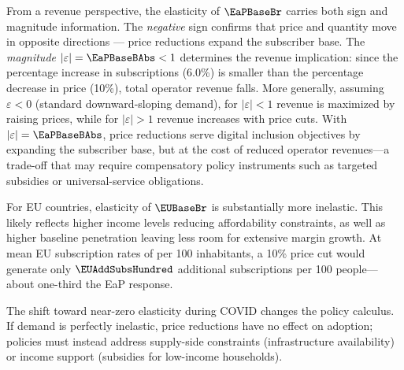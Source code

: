 From a revenue perspective, the elasticity of $\EaPBaseBr$ carries both sign and magnitude information. The \emph{negative} sign confirms that price and quantity move in opposite directions --- price reductions expand the subscriber base. The \emph{magnitude} $|\varepsilon| = \EaPBaseBAbs < 1$ determines the revenue implication: since the percentage increase in subscriptions (6.0\%) is smaller than the percentage decrease in price (10\%), total operator revenue falls. More generally, assuming $\varepsilon < 0$ (standard downward-sloping demand), for $|\varepsilon| < 1$ revenue is maximized by raising prices, while for $|\varepsilon| > 1$ revenue increases with price cuts. With $|\varepsilon| = \EaPBaseBAbs$, price reductions serve digital inclusion objectives by expanding the subscriber base, but at the cost of reduced operator revenues---a trade-off that may require compensatory policy instruments such as targeted subsidies or universal-service obligations.

For EU countries, elasticity of $\EUBaseBr$ is substantially more inelastic. This likely reflects higher income levels reducing affordability constraints, as well as higher baseline penetration leaving less room for extensive margin growth. At mean EU subscription rates of \DescSubsEU{} per 100 inhabitants, a 10\% price cut would generate only $\EUAddSubsHundred$ additional subscriptions per 100 people---about one-third the EaP response.

The shift toward near-zero elasticity during COVID changes the policy calculus. If demand is perfectly inelastic, price reductions have no effect on adoption; policies must instead address supply-side constraints (infrastructure availability) or income support (subsidies for low-income households).
